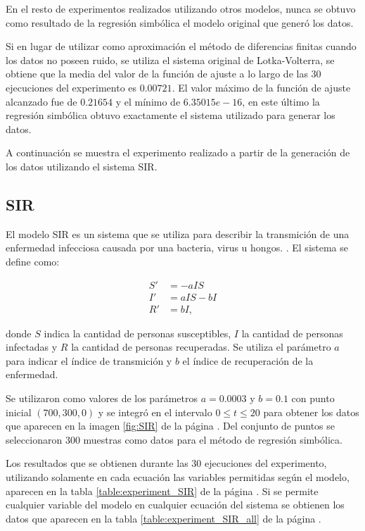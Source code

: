 En el resto de experimentos realizados utilizando otros modelos, nunca se obtuvo como resultado de la regresión simbólica el modelo original que generó los datos.

Si en lugar de utilizar como aproximación el método de diferencias finitas cuando los datos no poseen ruido, se utiliza el sistema original de Lotka-Volterra, se obtiene que la media del valor de la función de ajuste a lo largo de las 30 ejecuciones del experimento es $0.00721$. El valor máximo de la función de ajuste alcanzado fue de $0.21654$ y el mínimo de $6.35015e-16$, en este último la regresión simbólica obtuvo exactamente el sistema utilizado para generar los datos.


A continuación se muestra el experimento realizado a partir de la generación de los datos utilizando el sistema SIR.

\subsection{SIR}

El modelo SIR es un sistema que se utiliza para describir la transmición de una enfermedad infecciosa causada por una bacteria, virus u hongos. \cite{weiss2013sir}. El sistema se define como:

\begin{align*}
    S' & = - aIS    \\
    I' & = aIS - bI \\
    R' & = bI,
\end{align*}

donde $S$ indica la cantidad de personas susceptibles, $I$ la cantidad de personas infectadas y $R$ la cantidad de personas recuperadas. Se utiliza el parámetro $a$ para indicar el índice de transmición y $b$ el índice de recuperación de la enfermedad.

Se utilizaron como valores de los parámetros $a = 0.0003$ y $b = 0.1$ con punto inicial $(700, 300, 0)$ y se integró en el intervalo $0 \leq t \leq 20$ para obtener los datos que aparecen en la imagen \ref{fig:SIR} de la página \pageref{fig:SIR}. Del conjunto de puntos se seleccionaron 300 muestras como datos para el método de regresión simbólica.

Los resultados que se obtienen durante las 30 ejecuciones del experimento, utilizando solamente en cada ecuación las variables permitidas según el modelo, aparecen en la tabla \ref{table:experiment_SIR} de la página \pageref{table:experiment_SIR}. Si se permite cualquier variable del modelo en cualquier ecuación del sistema se obtienen los datos que aparecen en la tabla \ref{table:experiment_SIR_all} de la página \pageref{table:experiment_SIR_all}.

